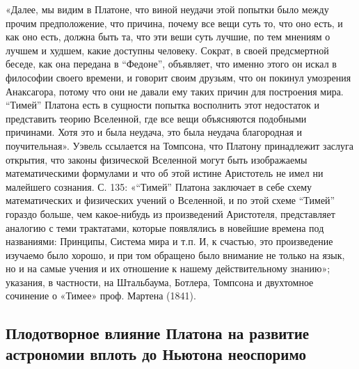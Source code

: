 «Далее, мы видим в Платоне, что виной неудачи этой попытки было между
прочим предположение, что причина, почему все вещи суть то, что оно
есть, и как оно есть, должна быть та, что эти веши суть лучшие, по тем
мнениям о лучшем и худшем, какие доступны человеку. Сократ, в своей
предсмертной беседе, как она передана в ``Федоне'', объявляет, что
именно этого он искал в философии своего времени, и говорит своим
друзьям, что он покинул умозрения Анаксагора, потому что они не давали
ему таких причин для построения мира. ``Тимей'' Платона есть в
сущности попытка восполнить этот недостаток и представить теорию
Вселенной, где все вещи объясняются подобными причинами. Хотя это и
была неудача, это была неудача благородная и поучительная». Уэвель
ссылается на Томпсона, что Платону принадлежит заслуга открытия, что
законы физической Вселенной могут быть изображаемы математическими
формулами и что об этой истине Аристотель не имел ни малейшего
сознания. С. 135: «``Тимей'' Платона заключает в себе схему
математических и физических учений о Вселенной, и по этой схеме
``Тимей'' гораздо больше, чем какое-нибудь из произведений Аристотеля,
представляет аналогию с теми трактатами, которые появлялись в новейшие
времена под названиями: Принципы, Система мира и т.п. И, к счастью,
это произведение изучаемо было хорошо, и при том обращено было
внимание не только на язык, но и на самые учения и их отношение к
нашему действительному знанию»; указания, в частности, на Штальбаума,
Ботлера, Томпсона и двухтомное сочинение о «Тимее» проф. Мартена
(1841).

\subsection{Плодотворное влияние Платона на развитие астрономии вплоть
до Ньютона неоспоримо}

